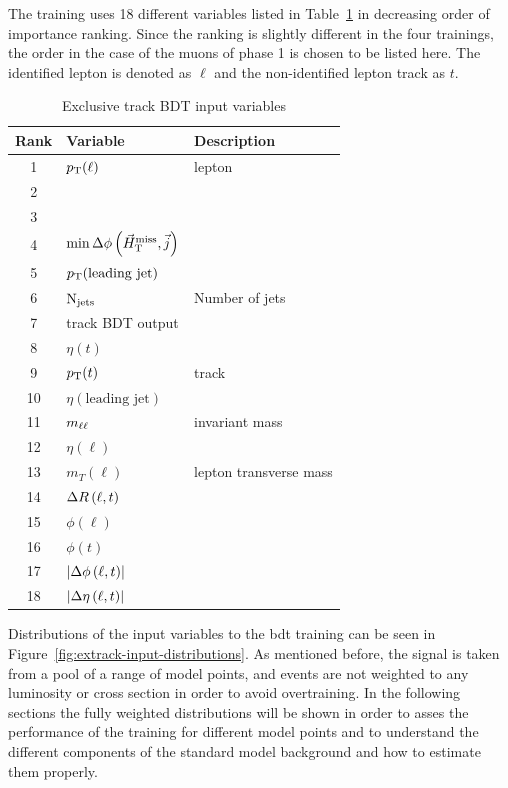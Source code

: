 The training uses 18 different variables listed in Table~\ref{tab:extrack-bdt-variables} in decreasing order of importance ranking. Since the ranking is slightly different in the four trainings, the order in the case of the muons of phase 1 is chosen to be listed here. The identified lepton is denoted as $\ell$ and the non-identified lepton track as $t$.

\begin{table}[!htb]
	\centering
	
		\caption{\label{tab:extrack-bdt-variables}Exclusive track BDT input variables}
			\begin{tabular}{cll} \hline
			Rank & Variable & Description \\ \hline
			1 & $p_{\mathrm{T}}(\ell)$ & lepton \pt\\
			2 & \HT & \\
			3 & \mht & \\
			4 & $\min{\Delta\phi\left(\ensuremath{\vec{H}_{\text{T}}^{\text{miss}}},\vec{j}\right)}$ & \\
			5 & $p_{\mathrm{T}}(\text{leading jet})$ & \\
			6 & $\mathrm{N}_{\mathrm{jets}}$ & Number of jets \\					7 & track BDT output & \\
			8 & $\eta(t)$ & \\
			9 & $p_{\mathrm{T}}(t)$ & track \pt\\
			10 & $\eta(\text{leading jet})$ & \\				11 & $m_{\ell\ell}$ & invariant mass \\
			12 & $\eta(\ell)$ & \\
			13 & $m_T(\ell)$ & lepton transverse mass\\			
			14 & $\Delta R\left(\ell, t\right)$ & \\
			15 & $\phi(\ell)$ & \\
			16 & $\phi(t)$ & \\
			17 & $\abs{\Delta\phi\left(\ell,t \right)}$ & \\			
			18 & $\abs{\Delta \eta \left(\ell, t\right) }$ & \\			
			\hline
			\end{tabular}
\end{table}

Distributions of the input variables to the \gls{bdt} training can be seen in Figure~\ref{fig:extrack-input-distributions}. As mentioned before, the signal is taken from a pool of a range of model points, and events are not weighted to any luminosity or cross section in order to avoid overtraining. In the following sections the fully weighted distributions will be shown in order to asses the performance of the training for different model points and to understand the different components of the standard model background and how to estimate them properly.

